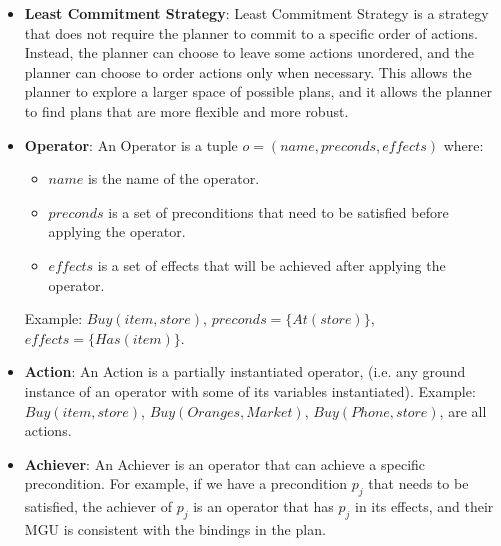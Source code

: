 \begin{itemize}
      \item \label{def:least_commitment_strategy}
            \textbf{Least Commitment Strategy}: Least Commitment Strategy is a strategy that does not require the planner to commit to a specific order of actions. Instead, the planner can choose to leave some actions unordered, and the planner can choose to order actions only when necessary. This allows the planner to explore a larger space of possible plans, and it allows the planner to find plans that are more flexible and more robust.

      \item \label{def:operator}
            \textbf{Operator}: An Operator is a tuple $o = (name, preconds, effects)$ where:
            \begin{itemize}
                  \item $name$ is the name of the operator.
                  \item $preconds$ is a set of preconditions that need to be satisfied before applying the operator.
                  \item $effects$ is a set of effects that will be achieved after applying the operator.
            \end{itemize}
            Example: $Buy(item,store)$, $preconds = \{At(store)\}$, $effects = \{Has(item)\}$.

      \item \label{def:action}
            \textbf{Action}: An Action  is a partially instantiated operator,
            (i.e. any ground instance of an operator with some of its variables instantiated).
            Example: $Buy(item,store)$, $Buy(Oranges,Market)$, $Buy(Phone,store)$, are all actions.

      \item \label{def:achiever}
            \textbf{Achiever}: An Achiever is an operator that can achieve a specific precondition. For example, if we have a precondition $p_j$ that needs to be satisfied, the achiever of $p_j$ is an operator that has $p_j$ in its effects, and their \ac{MGU} is consistent with the bindings in the plan.


\end{itemize}
